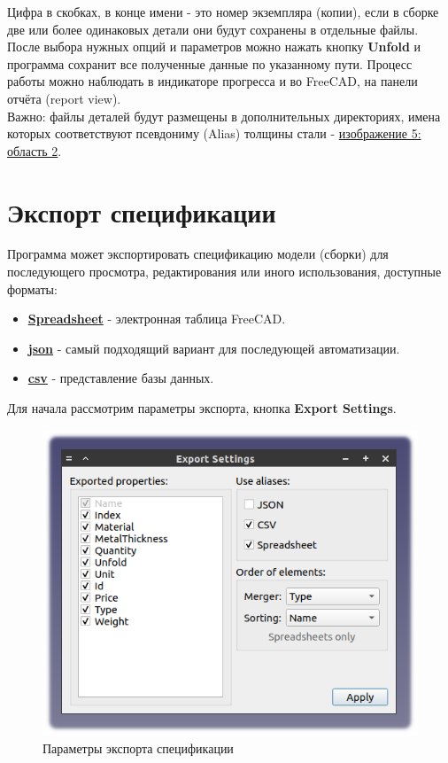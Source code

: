 \documentclass[a4paper,12pt]{article}
\begin{document}
Цифра в скобках, в конце имени - это номер экземпляра (копии), если в сборке две или более одинаковых детали они будут сохранены в отдельные файлы.\\

После выбора нужных опций и параметров можно нажать кнопку \textbf{Unfold} и программа сохранит все полученные данные по указанному пути. Процесс работы можно наблюдать в индикаторе прогресса и во FreeCAD, на панели отчёта (report view).\\

Важно: файлы деталей будут размещены в дополнительных директориях, имена которых соответствуют псевдониму (Alias) толщины стали - \hyperref[sec:pref_sm]{изображение 5: область 2}.

\pagebreak



\section{Экспорт спецификации}
Программа может экспортировать спецификацию модели (сборки) для последующего просмотра, редактирования или иного использования, доступные форматы:

\begin{itemize}
	\item \href{https://wiki.freecad.org/Spreadsheet_Workbench}{\textbf{Spreadsheet}} - электронная таблица FreeCAD.
	\item \href{https://ru.wikipedia.org/wiki/JSON}{\textbf{json}} - самый подходящий вариант для последующей автоматизации.
	\item \href{https://ru.wikipedia.org/wiki/CSV}{\textbf{csv}} - представление базы данных.
\end{itemize}

\begin{flushleft}Для начала рассмотрим параметры экспорта, кнопка \textbf{Export Settings}.\end{flushleft}

\begin{figure}[htp]
\centering
\includegraphics[scale=0.8]{img/specification_export.png}
\caption{Параметры экспорта спецификации}
\label{sec:specification_export}
\end{figure}
\end{document}
